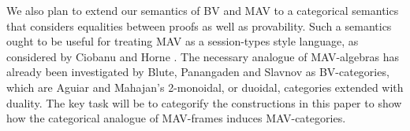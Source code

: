 We also plan to extend our semantics of BV and MAV to a categorical
semantics that considers equalities between proofs as well as
provability. Such a semantics ought to be useful for treating MAV as a
session-types style language, as considered by Ciobanu and Horne
\cite{Ciobanu_2016}. The necessary analogue of MAV-algebras has
already been investigated by Blute, Panangaden and Slavnov
\cite{Blute_2010} as BV-categories, which are Aguiar and Mahajan's
2-monoidal, or duoidal, categories \cite{Aguiar_2010} extended with
duality. The key task will be to categorify the constructions in this
paper to show how the categorical analogue of MAV-frames induces
MAV-categories.
